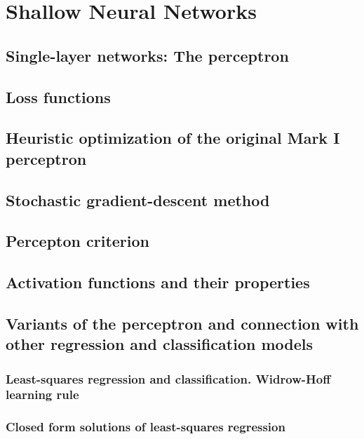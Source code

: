 \renewcommand{\prevpart}{1 }
\renewcommand{\thispart}{2 }
\renewcommand{\nextpart}{3 }

\section{Shallow Neural Networks}





\subsection{Single-layer networks: The perceptron}


\subsection{Loss functions}
\subsection{Heuristic optimization of the original Mark I perceptron}
\subsection{Stochastic gradient-descent method}
\subsection{Percepton criterion}
\subsection{Activation functions and their properties}
\subsection{Variants of the perceptron and 
    connection with other regression and classification models}

\subsubsection{Least-squares regression and classification. Widrow-Hoff learning rule}
\subsubsection{Closed form solutions of least-squares regression}
